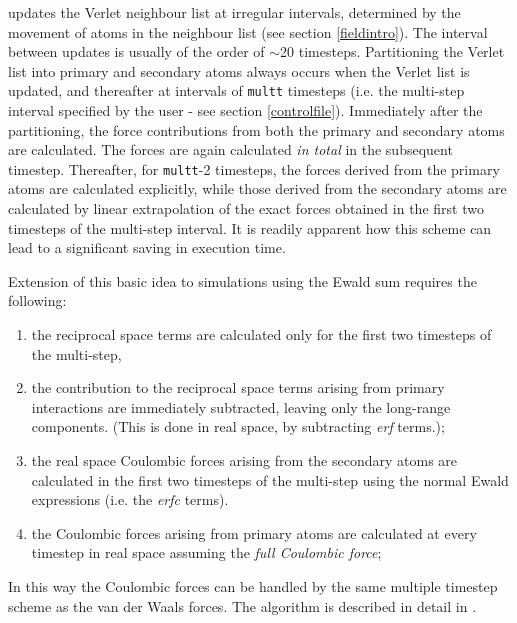 \D{} updates the Verlet neighbour list at irregular intervals,
determined by the movement of atoms in the neighbour list (see section
\ref{fieldintro}). The interval between updates is usually of the
order of $\sim$20 timesteps. Partitioning the Verlet list into primary
and secondary atoms always occurs when the Verlet list is updated, and
thereafter at intervals of {\tt multt} timesteps (i.e. the multi-step
interval specified by the user - see section \ref{controlfile}).
Immediately after the partitioning, the force contributions from both
the primary and secondary atoms are calculated.  The forces are again
calculated {\em in total} in the subsequent timestep.  Thereafter, for
{\tt multt}-2 timesteps, the forces derived from the primary atoms are
calculated explicitly, while those derived from the secondary atoms
are calculated by linear extrapolation of the exact forces obtained in
the first two timesteps of the multi-step interval. It is readily
apparent how this scheme can lead to a significant saving in execution
time.

Extension of this basic idea to simulations using the Ewald sum
requires the following:
\begin{enumerate}
\item the reciprocal space terms are calculated only for the first 
two timesteps of the multi-step,
\item the contribution to the reciprocal space terms arising from
primary interactions are immediately subtracted, leaving only the long-range
components. (This is done in real space, by subtracting {\em erf} terms.);
\item the real space Coulombic forces arising from the secondary atoms are
calculated in the first two timesteps of the multi-step using the
normal Ewald expressions (i.e. the {\em erfc} terms).
\item the Coulombic forces arising from primary atoms are calculated
at every timestep in real space assuming the {\em full Coulombic
force};
\end {enumerate}
In this way the Coulombic forces can be handled by the same multiple
timestep scheme as the van der
Waals forces. The algorithm is
described in detail in \cite{forester-94c}.

